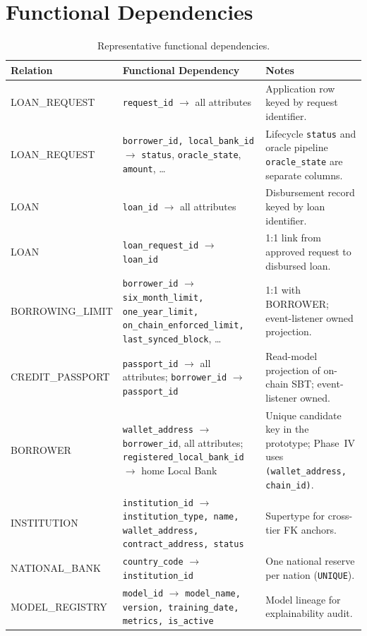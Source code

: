 \documentclass[12pt,a4paper]{report}
\newcommand{\tableheadcolor}{\rowcolor{TableHeadBg}}
\begin{document}
\section{Functional Dependencies}

\begin{table}[H]
\centering
\caption[Representative functional dependencies]{Representative functional dependencies.}
\label{tab:functional-deps}
\begin{tabular}{p{3cm}p{5.5cm}p{5cm}}
\toprule
\tableheadcolor
\textbf{Relation} & \textbf{Functional Dependency} & \textbf{Notes} \\
\midrule
LOAN\_REQUEST & \texttt{request\_id} $\to$ all attributes & Application row keyed by request identifier. \\
LOAN\_REQUEST & \texttt{borrower\_id, local\_bank\_id} $\to$ \texttt{status}, \texttt{oracle\_state}, \texttt{amount}, \ldots & Lifecycle \texttt{status} and oracle pipeline \texttt{oracle\_state} are separate columns. \\
LOAN & \texttt{loan\_id} $\to$ all attributes & Disbursement record keyed by loan identifier. \\
LOAN & \texttt{loan\_request\_id} $\to$ \texttt{loan\_id} & 1:1 link from approved request to disbursed loan. \\
BORROWING\_LIMIT & \texttt{borrower\_id} $\to$ \texttt{six\_month\_limit, one\_year\_limit,} \newline \texttt{on\_chain\_enforced\_limit, last\_synced\_block}, \ldots & 1:1 with BORROWER; event-listener owned projection. \\
CREDIT\_PASSPORT & \texttt{passport\_id} $\to$ all attributes; \texttt{borrower\_id} $\to$ \texttt{passport\_id} & Read-model projection of on-chain SBT; event-listener owned. \\
BORROWER & \texttt{wallet\_address} $\to$ \texttt{borrower\_id}, all attributes; \texttt{registered\_local\_bank\_id} $\to$ home Local Bank & Unique candidate key in the prototype; Phase~IV uses \texttt{(wallet\_address, chain\_id)}. \\
INSTITUTION & \texttt{institution\_id} $\to$ \texttt{institution\_type, name, wallet\_address, contract\_address, status} & Supertype for cross-tier FK anchors. \\
NATIONAL\_BANK & \texttt{country\_code} $\to$ \texttt{institution\_id} & One national reserve per nation (\texttt{UNIQUE}). \\
MODEL\_REGISTRY & \texttt{model\_id} $\to$ \texttt{model\_name, version, training\_date, metrics, is\_active} & Model lineage for explainability audit. \\

\end{tabular}
\end{table}
\end{document}

